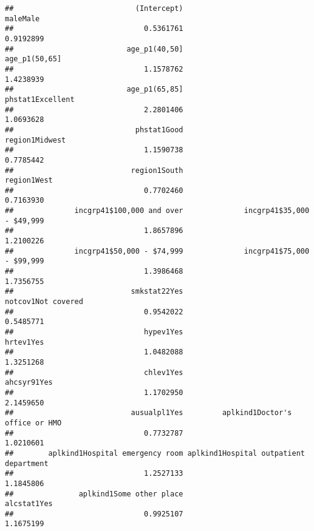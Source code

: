 \documentclass[]{article}
\begin{document}
\begin{verbatim}
##                            (Intercept)                               maleMale 
##                              0.5361761                              0.9192899 
##                          age_p1(40,50]                          age_p1(50,65] 
##                              1.1578762                              1.4238939 
##                          age_p1(65,85]                       phstat1Excellent 
##                              2.2801406                              1.0693628 
##                            phstat1Good                         region1Midwest 
##                              1.1590738                              0.7785442 
##                           region1South                            region1West 
##                              0.7702460                              0.7163930 
##              incgrp41$100,000 and over              incgrp41$35,000 - $49,999 
##                              1.8657896                              1.2100226 
##              incgrp41$50,000 - $74,999              incgrp41$75,000 - $99,999 
##                              1.3986468                              1.7356755 
##                           smkstat22Yes                     notcov1Not covered 
##                              0.9542022                              0.5485771 
##                              hypev1Yes                              hrtev1Yes 
##                              1.0482088                              1.3251268 
##                              chlev1Yes                            ahcsyr91Yes 
##                              1.1702950                              2.1459650 
##                           ausualpl1Yes         aplkind1Doctor's office or HMO 
##                              0.7732787                              1.0210601 
##        aplkind1Hospital emergency room aplkind1Hospital outpatient department 
##                              1.2527133                              1.1845806 
##               aplkind1Some other place                            alcstat1Yes 
##                              0.9925107                              1.1675199
\end{verbatim}
\end{document}
